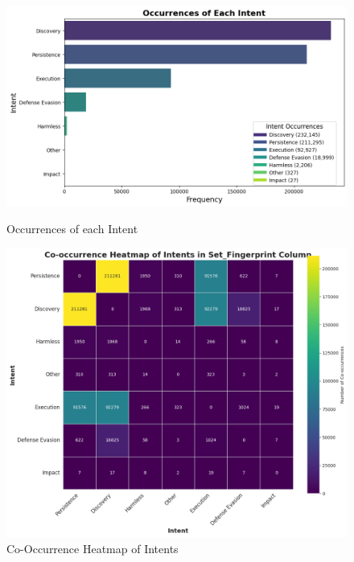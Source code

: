         \begin{figure}[h]
            \centering
            \begin{minipage}[c]{0.47\textwidth}
                \centering
                \includegraphics[width=\textwidth]{../figures/plots/section1/occurrences_of_each_intent.png}
                \caption{Occurrences of each Intent}
                \label{fig:occurrences-of-each-intent}
            \end{minipage}
            \hfill
            \begin{minipage}[c]{0.47\textwidth}
                \centering
                \includegraphics[width=\textwidth]{../figures/plots/section1/co-occurrence_heatmap_of_intents_in_set_fingerprint_column.png}
                \caption{Co-Occurrence Heatmap of Intents}
                \label{fig:co-occurrence-heatmap-of-intents}
            \end{minipage}
        \end{figure}

